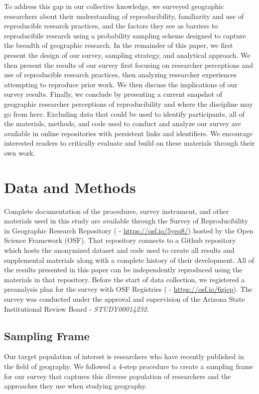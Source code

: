 \documentclass[]{interact}
\theoremstyle{plain}%
\theoremstyle{definition}
\theoremstyle{remark}
\begin{document}
To address this gap in our collective knowledge, we surveyed geographic researchers about their understanding of reproducibility, familiarity and use of reproducible research practices, and the factors they see as barriers to reproducibile research using a probability sampling scheme designed to capture the breadth of geographic research.
In the remainder of this paper, we first present the design of our survey, sampling strategy, and analytical approach. 
We then present the results of our survey first focusing on researcher perceptions and use of reproducible research practices, then analyzing researcher experiences attempting to reproduce prior work. 
We then discuss the implications of our survey results. 
Finally, we conclude by presenting a current snapshot of geographic researcher perceptions of reproducibility and where the discipline may go from here. 
Excluding data that could be used to identify participants, all of the materials, methods, and code used to conduct and analyze our survey are available in online repositories with persistent links and identifiers. 
We encourage interested readers to critically evaluate and build on these materials through their own work.


\section*{Data and Methods}
Complete documentation of the procedures, survey instrument, and other materials used in this study are available through the Survey of Reproducibility in Geographic Research Repository (\citet{Kedron_Holler_Bardin_Hilgendorf_2022} - \url{https://osf.io/5yeq8/}) hosted by the Open Science Framework (OSF).
That repository connects to a Github repository which hosts the anonymized dataset and code used to create all results and supplemental materials along with a complete history of their development. 
All of the results presented in this paper can be independently reproduced using the materials in that repository.
Before the start of data collection, we registered a preanalysis plan for the survey with OSF Registries (\citet{Kedron_Survey_PAP} - \url{https://osf.io/6zjcp}). 
The survey was conducted under the approval and supervision of the Arizona State Institutional Review Board - \textit{STUDY00014232}.

\subsection*{Sampling Frame}
Our target population of interest is researchers who have recently published in the field of geography. 
We followed a 4-step procedure to create a sampling frame for our survey that captures this diverse population of researchers and the approaches they use when studying geography. 
\end{document}
